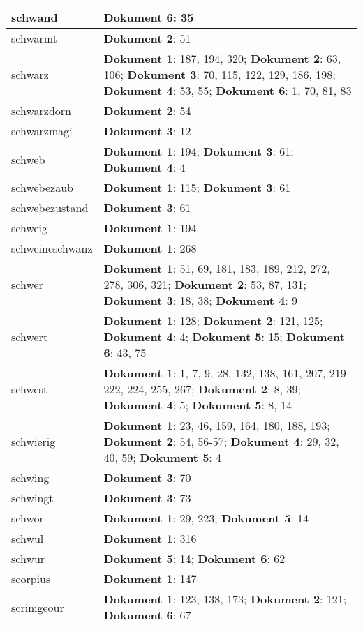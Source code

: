\documentclass[a5paper]{article}
\begin{document}
\begin{longtable}[l]{|l|p{3in}|}
\hline
schwand & \textbf{Dokument 6}: 35 \\
\hline
schwarmt & \textbf{Dokument 2}: 51 \\
\hline
schwarz & \textbf{Dokument 1}: 187, 194, 320; \textbf{Dokument 2}: 63, 106; \textbf{Dokument 3}: 70, 115, 122, 129, 186, 198; \textbf{Dokument 4}: 53, 55; \textbf{Dokument 6}: 1, 70, 81, 83 \\
\hline
schwarzdorn & \textbf{Dokument 2}: 54 \\
\hline
schwarzmagi & \textbf{Dokument 3}: 12 \\
\hline
schweb & \textbf{Dokument 1}: 194; \textbf{Dokument 3}: 61; \textbf{Dokument 4}: 4 \\
\hline
schwebezaub & \textbf{Dokument 1}: 115; \textbf{Dokument 3}: 61 \\
\hline
schwebezustand & \textbf{Dokument 3}: 61 \\
\hline
schweig & \textbf{Dokument 1}: 194 \\
\hline
schweineschwanz & \textbf{Dokument 1}: 268 \\
\hline
schwer & \textbf{Dokument 1}: 51, 69, 181, 183, 189, 212, 272, 278, 306, 321; \textbf{Dokument 2}: 53, 87, 131; \textbf{Dokument 3}: 18, 38; \textbf{Dokument 4}: 9 \\
\hline
schwert & \textbf{Dokument 1}: 128; \textbf{Dokument 2}: 121, 125; \textbf{Dokument 4}: 4; \textbf{Dokument 5}: 15; \textbf{Dokument 6}: 43, 75 \\
\hline
schwest & \textbf{Dokument 1}: 1, 7, 9, 28, 132, 138, 161, 207, 219-222, 224, 255, 267; \textbf{Dokument 2}: 8, 39; \textbf{Dokument 4}: 5; \textbf{Dokument 5}: 8, 14 \\
\hline
schwierig & \textbf{Dokument 1}: 23, 46, 159, 164, 180, 188, 193; \textbf{Dokument 2}: 54, 56-57; \textbf{Dokument 4}: 29, 32, 40, 59; \textbf{Dokument 5}: 4 \\
\hline
schwing & \textbf{Dokument 3}: 70 \\
\hline
schwingt & \textbf{Dokument 3}: 73 \\
\hline
schwor & \textbf{Dokument 1}: 29, 223; \textbf{Dokument 5}: 14 \\
\hline
schwul & \textbf{Dokument 1}: 316 \\
\hline
schwur & \textbf{Dokument 5}: 14; \textbf{Dokument 6}: 62 \\
\hline
scorpius & \textbf{Dokument 1}: 147 \\
\hline
scrimgeour & \textbf{Dokument 1}: 123, 138, 173; \textbf{Dokument 2}: 121; \textbf{Dokument 6}: 67 \\

\end{longtable}
\end{document}
